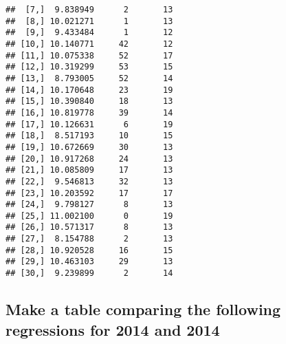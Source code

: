 \documentclass{article}\usepackage[]{graphicx}\usepackage[]{color}
\makeatletter
\newenvironment{kframe}{%
 \def\at@end@of@kframe{}%
 \ifinner\ifhmode%
  \def\at@end@of@kframe{\end{minipage}}%
  \begin{minipage}{\columnwidth}%
 \fi\fi%
 \def\FrameCommand##1{\hskip\@totalleftmargin \hskip-\fboxsep
 \colorbox{shadecolor}{##1}\hskip-\fboxsep
     \hskip-\linewidth \hskip-\@totalleftmargin \hskip\columnwidth}%
 \MakeFramed {\advance\hsize-\width
   \@totalleftmargin\z@ \linewidth\hsize
   \@setminipage}}%
 {\par\unskip\endMakeFramed%
 \at@end@of@kframe}
\newenvironment{knitrout}{}{} %
\makeatother
\begin{document}
\begin{knitrout}
\begin{kframe}
\begin{verbatim}
##  [7,]  9.838949      2       13
##  [8,] 10.021271      1       13
##  [9,]  9.433484      1       12
## [10,] 10.140771     42       12
## [11,] 10.075338     52       17
## [12,] 10.319299     53       15
## [13,]  8.793005     52       14
## [14,] 10.170648     23       19
## [15,] 10.390840     18       13
## [16,] 10.819778     39       14
## [17,] 10.126631      6       19
## [18,]  8.517193     10       15
## [19,] 10.672669     30       13
## [20,] 10.917268     24       13
## [21,] 10.085809     17       13
## [22,]  9.546813     32       13
## [23,] 10.203592     17       17
## [24,]  9.798127      8       13
## [25,] 11.002100      0       19
## [26,] 10.571317      8       13
## [27,]  8.154788      2       13
## [28,] 10.920528     16       15
## [29,] 10.463103     29       13
## [30,]  9.239899      2       14
\end{verbatim}
\end{kframe}
\end{knitrout}

\subsection{Make a table comparing the following regressions for 2014 and 2014}
\end{document}
